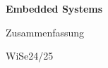 \documentclass[a4paper, 10pt, twoside]{article}
\begin{document}
\begin{titlepage}
    \centering
    {\Huge\bfseries Embedded Systems\par}
    \vspace{1cm}
    {\Large Zusammenfassung\par}
    \vspace{2cm}
    {\large WiSe24/25\par}
    \vfill
\end{titlepage}

\tableofcontents
\clearpage



\end{document}
